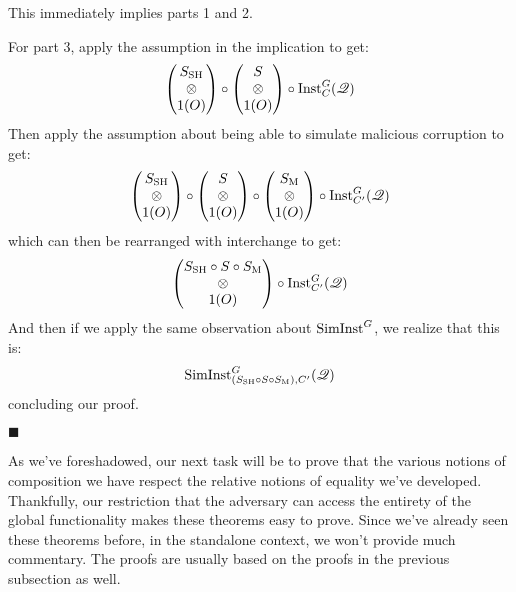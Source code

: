 \begin{theorem}
  This immediately implies parts 1 and 2.

  For part 3, apply the assumption in the implication to get:
  $$
  \begin{pmatrix}
    S_{\text{SH}}\cr
    \otimes\cr
    1(O)
  \end{pmatrix}
  \circ
  \begin{pmatrix}
    S\cr
    \otimes\cr
    1(O)
  \end{pmatrix}
  \circ
  \text{Inst}^G_C(\mathscr{Q})
  $$
  Then apply the assumption about being able to simulate malicious corruption to
  get:
  $$
  \begin{pmatrix}
    S_{\text{SH}}\cr
    \otimes\cr
    1(O)
  \end{pmatrix}
  \circ
  \begin{pmatrix}
    S\cr
    \otimes\cr
    1(O)
  \end{pmatrix}
  \circ
  \begin{pmatrix}
    S_{\text{M}}\cr
    \otimes\cr
    1(O)
  \end{pmatrix}
  \circ
  \text{Inst}^G_{C'}(\mathscr{Q})
  $$
  which can then be rearranged with interchange to get:
  $$
  \begin{pmatrix}
    S_{\text{SH}} \circ S \circ S_{\text{M}}\cr
    \otimes\cr
    1(O)
  \end{pmatrix}
  \circ
  \text{Inst}^G_{C'}(\mathscr{Q})
  $$
  And then if we apply the same observation about $\text{SimInst}^G$, we realize
  that this is:
  $$
  \text{SimInst}^G_{(S_{\text{SH}} \circ S \circ S_{\text{M}}), C'}(\mathscr{Q})
  $$
  concluding our proof.

  $\blacksquare$
\end{theorem}

As we've foreshadowed, our next task will be to prove
that the various notions of composition we have
respect the relative notions of equality we've developed.
Thankfully, our restriction that the adversary
can access the entirety of the global functionality makes
these theorems easy to prove.
Since we've already seen these theorems before, in the standalone
context, we won't provide much commentary.
The proofs are usually based on the proofs in the previous subsection
as well.

